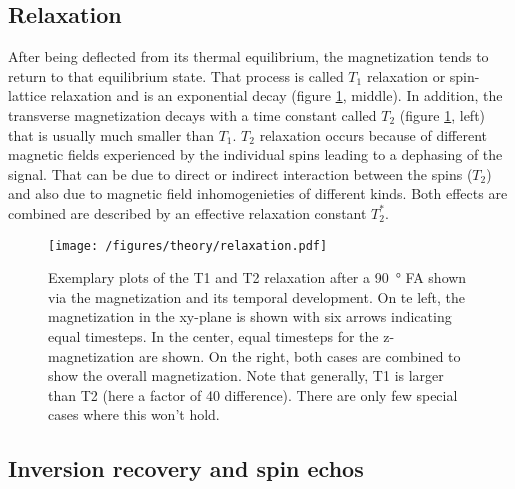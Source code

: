         \subsection{Relaxation}
        \label{chapter:theory:relaxation}
        After being deflected from its thermal equilibrium, the magnetization tends to return to that equilibrium state. That process is called $T_1$ relaxation or spin-lattice relaxation and is an exponential decay (figure \ref{theory:figure:relaxation}, middle). In addition, the transverse magnetization decays with a time constant called $T_2$ (figure \ref{theory:figure:relaxation}, left) that is usually much smaller than $T_1$. $T_2$ relaxation occurs because of different magnetic fields experienced by the individual spins leading to a dephasing of the signal. That can be due to direct or indirect interaction between the spins ($T_2$) and also due to magnetic field inhomogenieties of different kinds. Both effects are combined are described by an effective relaxation constant $T_2^*$.
            \begin{figure}
                \centering
                \texttt{[image: /figures/theory/relaxation.pdf]}
                \caption[Relaxation in NMR]{Exemplary plots of the T1 and T2 relaxation after a \SI{90}{\degree} FA shown via the magnetization and its temporal development. On te left, the magnetization in the xy-plane is shown with six arrows indicating equal timesteps. In the center, equal timesteps for the z-magnetization are shown. On the right, both cases are combined to show the overall magnetization. Note that generally, T1 is larger than T2 (here a factor of 40 difference). There are only few special cases where this won't hold.}
                \label{theory:figure:relaxation}
            \end{figure}
        \subsection{Inversion recovery and spin echos}

